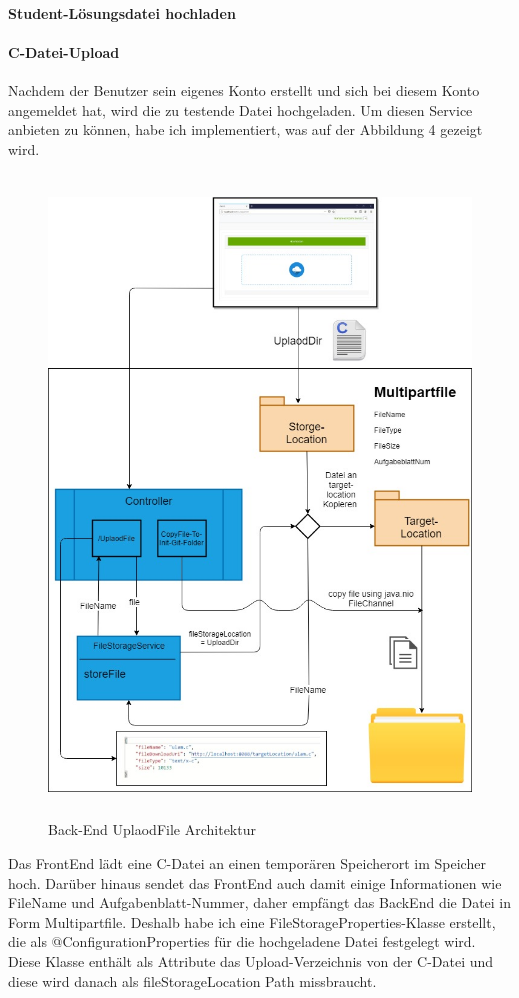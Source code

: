 \documentclass[apaper4,12p]{scrartcl}
\begin{document}
\paragraph{Student-Lösungsdatei hochladen}
\paragraph{C-Datei-Upload}
Nachdem der Benutzer sein eigenes Konto erstellt und sich bei diesem Konto angemeldet hat, wird die zu testende Datei hochgeladen. Um diesen Service anbieten zu können, habe ich implementiert, was auf der Abbildung 4 gezeigt wird.
\begin{figure}[h!]
	\begin{center}
		\includegraphics[width=17cm, height=17cm]{UplaodFileArchi.jpg}
		\caption{Back-End UplaodFile Architektur} 
		\label{Back-End UplaodFile Architektur} 
	\end{center}
\end{figure}
\newline
Das FrontEnd lädt eine C-Datei an einen temporären Speicherort im Speicher hoch. Darüber hinaus sendet das FrontEnd auch damit einige Informationen wie FileName und Aufgabenblatt-Nummer, daher empfängt das BackEnd die Datei in Form Multipartfile. Deshalb habe ich eine FileStorageProperties-Klasse erstellt, die als @ConfigurationProperties für die hochgeladene Datei festgelegt wird. Diese Klasse enthält als Attribute das Upload-Verzeichnis von der C-Datei und diese wird danach als fileStorageLocation Path missbraucht.
\end{document}
